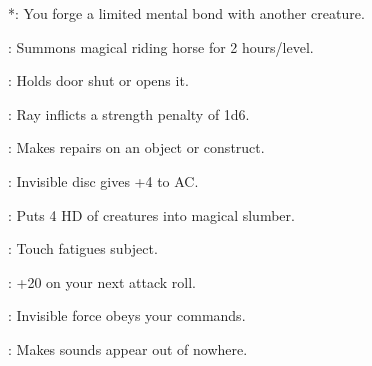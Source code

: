 \begin{list}{}{\leftmargin=1em}
\item {}*: You forge a limited mental bond with another creature.
\item {}: Summons magical riding horse for 2 hours/level.
\item {}: Holds door shut or opens it.
\item {}: Ray inflicts a strength penalty of 1d6.
\item {}: Makes repairs on an object or construct.
\item {}: Invisible disc gives +4 to AC.
\item {}: Puts 4 HD of creatures into magical slumber.
\item {}: Touch fatigues subject.
\item {}: +20 on your next attack roll.
\item {}: Invisible force obeys your commands.
\item {}: Makes sounds appear out of nowhere.
\end{list}
